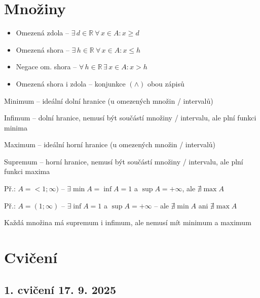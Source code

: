 \documentclass[12pt, a4paper]{scrartcl}
\begin{document}
    \section{Množiny}
    \begin{itemize}
        \item Omezená zdola -- $\exists\, d \in \mathds{R} \ \forall\, x \in A : x \geq d$
        \item Omezená shora -- $\exists\,  h \in \mathds{R} \ \forall\, x \in A : x \leq h$
        \item Negace om. shora -- $ \forall\,  h \in \mathds{R}\, \exists\, x \in A: x > h$
        \item Omezená shora i zdola -- konjunkce $(\wedge)$ obou zápisů
    \end{itemize}

    Minimum -- ideální dolní hranice (u omezených množin / intervalů)

    Infimum -- dolní hranice, nemusí být součástí množiny / intervalu, ale plní funkci minima

    Maximum -- ideální horní hranice (u omezených množin / intervalů)

    Supremum -- horní hranice, nemusí být součástí množiny / intervalu, ale plní funkci maxima

    Př.: $A = < 1; \infty )$ -- $\exists \min A = \inf A = 1$ a $\sup A = +\infty$, ale $\nexists \max A$

    Př.: $A = (1; \infty )$ -- $\exists \inf A = 1$ a $\sup A = +\infty$ -- ale $\nexists \min A$ ani $\nexists \max A$

    Každá množina má supremum i infimum, ale nemusí mít minimum a maximum

    \section{Cvičení}
    \subsection{1. cvičení 17. 9. 2025}
\end{document}
